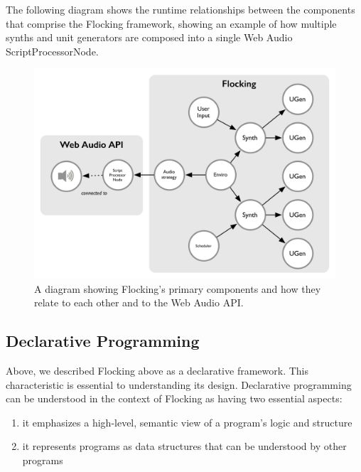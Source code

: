 \documentclass{article}
\begin{document}
The following diagram shows the runtime relationships between the components that comprise the Flocking framework, showing an example of how multiple synths and unit generators are composed into a single Web Audio ScriptProcessorNode.

\begin{figure}[h]
\centering
\includegraphics[width=0.9\columnwidth]{images/flocking-component-architecture.png}
\caption{ A diagram showing Flocking's primary components and how they relate to each other and to the Web Audio API.\label{fig:architecture}}
\end{figure}

\subsection{Declarative Programming}

Above, we described Flocking above as a declarative framework. This characteristic is essential to understanding its design. Declarative programming can be understood in the context of Flocking as having two essential aspects:

\begin{enumerate}
\item it emphasizes a high-level, semantic view of a program's logic and structure
\item it represents programs as data structures that can be understood by other programs
\end{enumerate}
\end{document}
